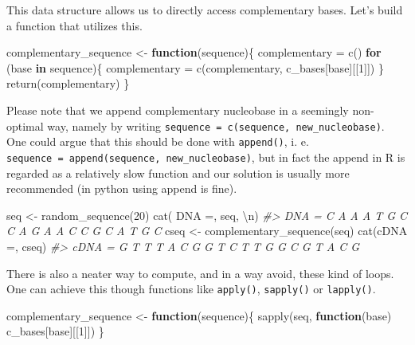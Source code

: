 \documentclass[
]{book}
\newenvironment{Shaded}{\begin{snugshade}}{\end{snugshade}}
\newcommand{\CommentTok}[1]{\textcolor[rgb]{0.56,0.35,0.01}{\textit{#1}}}
\newcommand{\ControlFlowTok}[1]{\textcolor[rgb]{0.13,0.29,0.53}{\textbf{#1}}}
\newcommand{\DecValTok}[1]{\textcolor[rgb]{0.00,0.00,0.81}{#1}}
\newcommand{\FunctionTok}[1]{\textcolor[rgb]{0.00,0.00,0.00}{#1}}
\newcommand{\NormalTok}[1]{#1}
\newcommand{\OtherTok}[1]{\textcolor[rgb]{0.56,0.35,0.01}{#1}}
\newcommand{\SpecialCharTok}[1]{\textcolor[rgb]{0.00,0.00,0.00}{#1}}
\newcommand{\StringTok}[1]{\textcolor[rgb]{0.31,0.60,0.02}{#1}}
\begin{document}
This data structure allows us to directly access complementary bases. Let's build a function that utilizes this.

\begin{Shaded}
\begin{Highlighting}[]
\NormalTok{complementary\_sequence }\OtherTok{\textless{}{-}} \ControlFlowTok{function}\NormalTok{(sequence)\{}
\NormalTok{  complementary }\OtherTok{=} \FunctionTok{c}\NormalTok{()}
  \ControlFlowTok{for}\NormalTok{ (base }\ControlFlowTok{in}\NormalTok{ sequence)\{}
\NormalTok{    complementary }\OtherTok{=} \FunctionTok{c}\NormalTok{(complementary, c\_bases[base][[}\DecValTok{1}\NormalTok{]])}
\NormalTok{  \}}
  \FunctionTok{return}\NormalTok{(complementary)}
\NormalTok{\}}
\end{Highlighting}
\end{Shaded}

Please note that we append complementary nucleobase in a seemingly non-optimal way, namely by writing \texttt{sequence\ =\ c(sequence,\ new\_nucleobase)}. One could argue that this should be done with \texttt{append()}, i. e. \texttt{sequence\ =\ append(sequence,\ new\_nucleobase)}, but in fact the append in R is regarded as a relatively slow function and our solution is usually more recommended (in python using append is fine).

\begin{Shaded}
\begin{Highlighting}[]
\NormalTok{seq }\OtherTok{\textless{}{-}} \FunctionTok{random\_sequence}\NormalTok{(}\DecValTok{20}\NormalTok{)}
\FunctionTok{cat}\NormalTok{(}\StringTok{\textquotesingle{} DNA =\textquotesingle{}}\NormalTok{, seq, }\StringTok{\textquotesingle{}}\SpecialCharTok{\textbackslash{}n}\StringTok{\textquotesingle{}}\NormalTok{)}
\CommentTok{\#\textgreater{}  DNA = C A A A T G C C A G A A C C G C A T G C}
\NormalTok{cseq }\OtherTok{\textless{}{-}} \FunctionTok{complementary\_sequence}\NormalTok{(seq)}
\FunctionTok{cat}\NormalTok{(}\StringTok{\textquotesingle{}cDNA =\textquotesingle{}}\NormalTok{, cseq)}
\CommentTok{\#\textgreater{} cDNA = G T T T A C G G T C T T G G C G T A C G}
\end{Highlighting}
\end{Shaded}

There is also a neater way to compute, and in a way avoid, these kind of loops. One can achieve this though functions like \texttt{apply()}, \texttt{sapply()} or \texttt{lapply()}.

\begin{Shaded}
\begin{Highlighting}[]
\NormalTok{complementary\_sequence }\OtherTok{\textless{}{-}} \ControlFlowTok{function}\NormalTok{(sequence)\{}
  \FunctionTok{sapply}\NormalTok{(seq, }\ControlFlowTok{function}\NormalTok{(base) c\_bases[base][[}\DecValTok{1}\NormalTok{]])}
\NormalTok{\}}
\end{Highlighting}
\end{Shaded}
\end{document}
